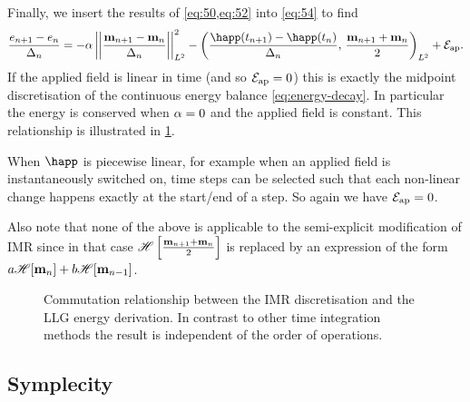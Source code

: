 Finally, we insert the results of \cref{eq:50,eq:52} into \cref{eq:54} to find
\begin{equation}
  \frac{\e_{n+1} - \e_n}{\dtn}
  = -\dampc \ltnorm{\mpdmdt}^2
  - \ltip{\frac{\happ(t_{n+1}) -\happ(t_n)}{\dtn}}{\frac{\mv_{n+1} + \mv_{n}}{2}}
  + \happerror.
  \label{eqn:imr-llg-energy}
\end{equation}
If the applied field is linear in time (and so $\mathcal{E}_\text{ap} = 0$) this is exactly the midpoint discretisation of the continuous energy balance \cref{eq:energy-decay}.
In particular the energy is conserved when $\alpha = 0$ and the applied field is constant.
This relationship is illustrated in \cref{fig:commutation-imr-energy}.

When $\happ$ is piecewise linear, for example when an applied field is instantaneously switched on, time steps can be selected such that each non-linear change happens exactly at the start/end of a step.
So again we have $\mathcal{E}_\text{ap} = 0$.

Also note that none of the above is applicable to the semi-explicit modification of IMR since in that case $\mathscr{H} \left[ \frac{\mathbf{m}_{n+1} + \mathbf{m}_n}{2} \right]$ is replaced by an expression of the form $a\mathscr{H} {\left[ \mathbf{m}_n \right]} + b\mathscr{H} {\left[ \mathbf{m}_{n-1} \right]}$.

\begin{figure}
  \centering
  \caption{Commutation relationship between the IMR discretisation and the LLG energy derivation. 
In contrast to other time integration methods the result is independent of the order of operations.}
\label{fig:commutation-imr-energy}
\end{figure}


\subsection{Symplecity}

